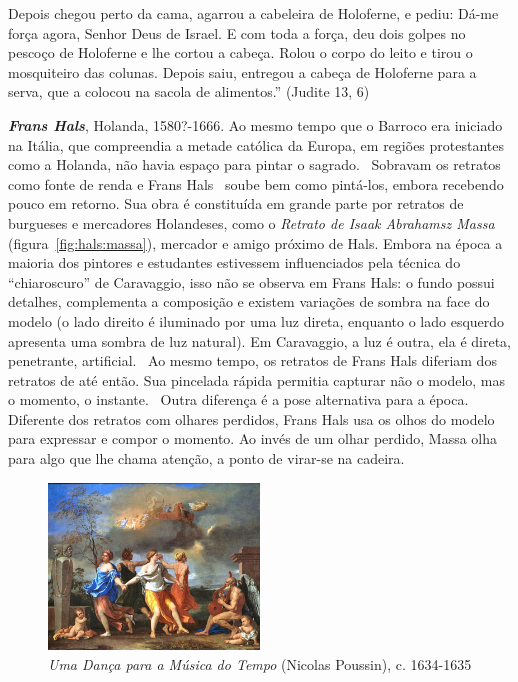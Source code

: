 Depois chegou perto da cama, agarrou a cabeleira de Holoferne, e
pediu: Dá-me força agora, Senhor Deus de Israel. E com toda a força,
deu dois golpes no pescoço de Holoferne e lhe cortou a cabeça. Rolou o
corpo do leito e tirou o mosquiteiro das colunas. Depois saiu,
entregou a cabeça de Holoferne para a serva, que a colocou na sacola
de alimentos.'' (Judite 13, 6)

\textbf{\emph{Frans Hals}}, Holanda, 1580?-1666. Ao mesmo tempo que o
Barroco era iniciado na Itália, que compreendia a metade católica da
Europa, em regiões protestantes como a Holanda, não havia espaço para
pintar o sagrado.~\cite{gombrich} Sobravam os retratos como fonte de
renda e Frans Hals~\cite{grimm} soube bem como pintá-los, embora
recebendo pouco em retorno. Sua obra é constituída em grande parte por
retratos de burgueses e mercadores Holandeses, como o \textit{Retrato
de Isaak Abrahamsz Massa} (figura~\ref{fig:hals:massa}), mercador e
amigo próximo de Hals. Embora na época a maioria dos pintores e
estudantes estivessem influenciados pela técnica do ``chiaroscuro'' de
Caravaggio, isso não se observa em Frans Hals: o fundo possui
detalhes, complementa a composição e existem variações de sombra na
face do modelo (o lado direito é iluminado por uma luz direta,
enquanto o lado esquerdo apresenta uma sombra de luz natural). Em
Caravaggio, a luz é outra, ela é direta, penetrante,
artificial.~\cite{gombrich} Ao mesmo tempo, os retratos de Frans Hals
diferiam dos retratos de até então. Sua pincelada rápida permitia
capturar não o modelo, mas o momento, o instante.~\cite{peter} Outra
diferença é a pose alternativa para a época. Diferente dos retratos
com olhares perdidos, Frans Hals usa os olhos do modelo para expressar
e compor o momento. Ao invés de um olhar perdido, Massa olha para algo
que lhe chama atenção, a ponto de virar-se na cadeira.

\begin{figure}
  \vspace{-15pt}
  \begin{centering}
    \caption{\emph{Uma Dança para a Música do Tempo} (Nicolas Poussin), c. 1634-1635}
    \label{fig:poussin:danca}
    \includegraphics[width=0.5\textwidth]{figs/poussin_danca.png}
  \end{centering}  
\end{figure}

